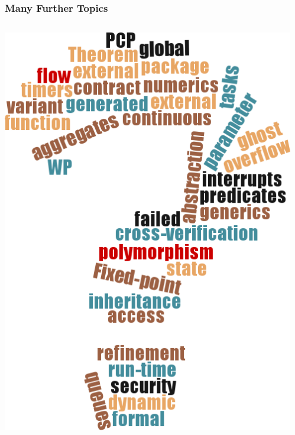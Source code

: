 \begin{frame}
  \frametitle{Many Further Topics}  
  \begin{columns}
    \begin{column}[T]{.5\textwidth}
      \includegraphics[height=.9\textheight]{content/images/spark/tagcloud}
    \end{column}
    \begin{column}[T]{.5\textwidth}

\end{column}
\end{columns}
\end{frame}
